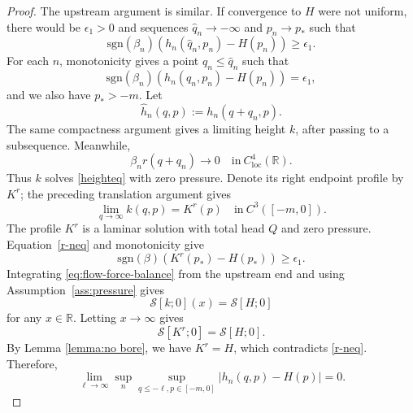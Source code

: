 \documentclass[12pt,letterpaper]{amsart}
\numberwithin{equation}{section}
\def\R{{\mathbb R}}
\def\sgn{\mathrm{sgn}}
\begin{document}
\begin{proof}
	{The upstream argument is similar. If convergence to $H$ were not uniform, there would be $\epsilon_1>0$ and sequences $\hat q_n\to-\infty$ and $p_n\to p_*$ such that}
	\begin{equation*}
		\sgn(\beta_n)(h_n(\hat q_n,p_n)-H(p_n))\ge\epsilon_1.
	\end{equation*}
	{For each $n$, monotonicity gives a point $q_n\leq\hat q_n$ such that}
	\begin{equation}\label{r-neq}
		\sgn(\beta_n)(h_n(q_n,p_n)-H(p_n))=\epsilon_1,
	\end{equation}
	and we also have $p_*>-m$. Let
	\begin{equation*}
		\hat h_{n}(q,p):=h_n(q+q_n,p).
	\end{equation*}
	{The same compactness argument gives a limiting height $k$, after passing to a subsequence. Meanwhile,}
	\begin{equation*}
		\beta_nr(q+q_n)\to 0\quad\mathrm{in~}C_{\mathrm{loc}}^{4}(\R).
	\end{equation*}
    {Thus $k$ solves \eqref{heighteq} with zero pressure. Denote its right endpoint profile by $K^r$; the preceding translation argument gives}
    \begin{equation*}
	    	\lim_{q\to\infty}k(q,p)=K^r(p) \quad\mathrm{in~}C^3([-m,0]).
    \end{equation*}
	{The profile $K^r$ is a laminar solution with total head $Q$ and zero pressure. Equation~\eqref{r-neq} and monotonicity give}
	\begin{equation*}
		\sgn(\beta)(K^r(p_*)-H(p_*))\geq \epsilon_1.
	\end{equation*}
	{Integrating \eqref{eq:flow-force-balance} from the upstream end and using Assumption~\ref{ass:pressure} gives}
	\begin{equation*}
\mathscr{S}[k;0](x)=\mathscr{S}[H;0]
	\end{equation*}
	for any $x\in\R$.
 {Letting $x\to\infty$ gives}
	\[\mathscr{S}[K^r;0]=\mathscr{S}[H;0].\]
	By Lemma \ref{lemma:no bore}, we have $K^r=H$, which contradicts \eqref{r-neq}.
	{Therefore,}
	\begin{equation*}
		{\lim_{\ell\to\infty}\sup_n\sup_{q\leq-\ell,p\in[-m,0]}}|h_n(q,p)-H(p)|=0.
	\end{equation*}
	

\end{proof}
\end{document}
